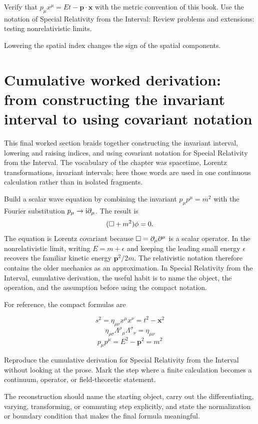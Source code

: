 \begin{exercise}
Verify that \(p_\mu x^\mu=Et-\bm p\cdot\bm x\) with the metric convention of this book.  Use the notation of Special Relativity from the Interval: Review problems and extensions: testing nonrelativistic limits.
\begin{answer}
Lowering the spatial index changes the sign of the spatial components.
\end{answer}
\end{exercise}



\section{Cumulative worked derivation: from constructing the invariant interval to using covariant notation}

This final worked section braids together constructing the invariant interval, lowering and raising indices, and using covariant notation for Special Relativity from the Interval.  The vocabulary of the chapter was spacetime, Lorentz transformations, invariant intervals; here those words are used in one continuous calculation rather than in isolated fragments.

Build a scalar wave equation by combining the invariant \(p_\mu p^\mu=m^2\) with the Fourier substitution \(p_\mu\to\mathrm i\partial_\mu\).  The result is
\[
  (\Box+m^2)\phi=0.
\]
The equation is Lorentz covariant because \(\Box=\partial_\mu\partial^\mu\) is a scalar operator.  In the nonrelativistic limit, writing \(E=m+\epsilon\) and keeping the leading small energy \(\epsilon\) recovers the familiar kinetic energy \(\bm p^2/2m\).  The relativistic notation therefore contains the older mechanics as an approximation.  In Special Relativity from the Interval, cumulative derivation, the useful habit is to name the object, the operation, and the assumption before using the compact notation.

For reference, the compact formulas are

\[
  s^2=\eta_{\mu\nu}x^\mu x^\nu=t^2-\bm x^2
\]
\[
  \eta_{\rho\sigma}\Lambda^\rho{}_\mu\Lambda^\sigma{}_\nu=\eta_{\mu\nu}
\]
\[
  p_\mu p^\mu=E^2-\bm p^2=m^2
\]

\begin{exercise}
Reproduce the cumulative derivation for Special Relativity from the Interval without looking at the prose.  Mark the step where a finite calculation becomes a continuum, operator, or field-theoretic statement.
\begin{answer}
The reconstruction should name the starting object, carry out the differentiating, varying, transforming, or commuting step explicitly, and state the normalization or boundary condition that makes the final formula meaningful.
\end{answer}
\end{exercise}



